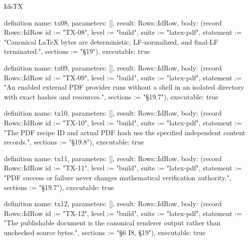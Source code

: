\begin{lexlean}{IdsTX}
\begin{semanticmodule}
definition{
  name: tx08,
  parameters: [],
  result: Rows::IdRow,
  body: (record Rows::IdRow {id := "TX-08", level := "build", suite := "latex-pdf", statement := "Canonical LaTeX bytes are deterministic, LF-normalized, and final-LF terminated.", sections := "§19"}),
  executable: true
}

definition{
  name: tx09,
  parameters: [],
  result: Rows::IdRow,
  body: (record Rows::IdRow {id := "TX-09", level := "build", suite := "latex-pdf", statement := "An enabled external PDF provider runs without a shell in an isolated directory with exact hashes and resources.", sections := "§19.7"}),
  executable: true
}

definition{
  name: tx10,
  parameters: [],
  result: Rows::IdRow,
  body: (record Rows::IdRow {id := "TX-10", level := "build", suite := "latex-pdf", statement := "The PDF recipe ID and actual PDF hash use the specified independent content records.", sections := "§19.8"}),
  executable: true
}

definition{
  name: tx11,
  parameters: [],
  result: Rows::IdRow,
  body: (record Rows::IdRow {id := "TX-11", level := "build", suite := "latex-pdf", statement := "PDF success or failure never changes mathematical verification authority.", sections := "§19.7"}),
  executable: true
}

definition{
  name: tx12,
  parameters: [],
  result: Rows::IdRow,
  body: (record Rows::IdRow {id := "TX-12", level := "build", suite := "latex-pdf", statement := "The publishable document is the canonical renderer output rather than unchecked source bytes.", sections := "§6 I8, §19"}),
  executable: true
}
\end{semanticmodule}
\end{lexlean}
